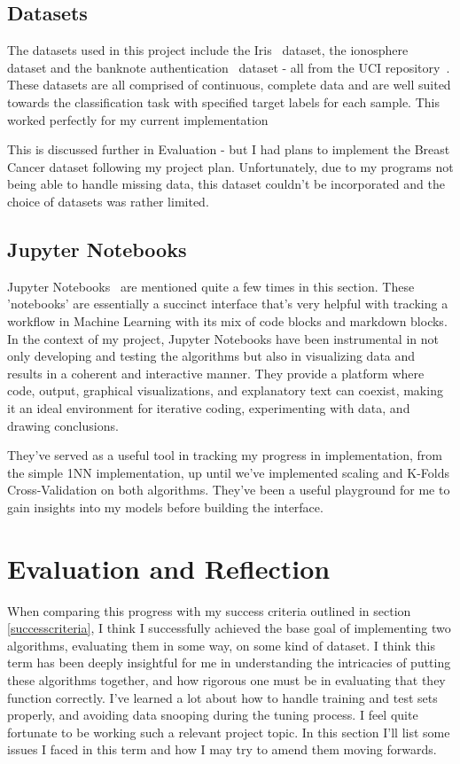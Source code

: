 \documentclass[letterpaper,10pt]{article}
\begin{document}
\subsection{Datasets}
The datasets used in this project include the Iris~\cite{irisdata} dataset, the ionosphere~\cite{ionosphere} dataset and the banknote authentication~\cite{banknote_authentication} dataset - all from the UCI repository~\cite{uci}. These datasets are all comprised of continuous, complete data and are well suited towards the classification task with specified target labels for each sample. This worked perfectly for my current implementation \par
This is discussed further in Evaluation - but I had plans to implement the Breast Cancer dataset following my project plan. Unfortunately, due to my programs not being able to handle missing data, this dataset couldn't be incorporated and the choice of datasets was rather limited. \par

\subsection{Jupyter Notebooks}
Jupyter Notebooks~\cite{jupyter} are mentioned quite a few times in this section. These 'notebooks' are essentially a succinct interface that's very helpful with tracking a workflow in Machine Learning with its mix of code blocks and markdown blocks. In the context of my project, Jupyter Notebooks have been instrumental in not only developing and testing the algorithms but also in visualizing data and results in a coherent and interactive manner. They provide a platform where code, output, graphical visualizations, and explanatory text can coexist, making it an ideal environment for iterative coding, experimenting with data, and drawing conclusions. \par
They've served as a useful tool in tracking my progress in implementation, from the simple 1NN implementation, up until we've implemented scaling and K-Folds Cross-Validation on both algorithms. They've been a useful playground for me to gain insights into my models before building the interface. \par

\newpage
\section{Evaluation and Reflection}
When comparing this progress with my success criteria outlined in section \ref{successcriteria}, I think I successfully achieved the base goal of implementing two algorithms, evaluating them in some way, on some kind of dataset. I think this term has been deeply insightful for me in understanding the intricacies of putting these algorithms together, and how rigorous one must be in evaluating that they function correctly. I've learned a lot about how to handle training and test sets properly, and avoiding data snooping during the tuning process. I feel quite fortunate to be working such a relevant project topic. In this section I'll list some issues I faced in this term and how I may try to amend them moving forwards.\par
\end{document}
